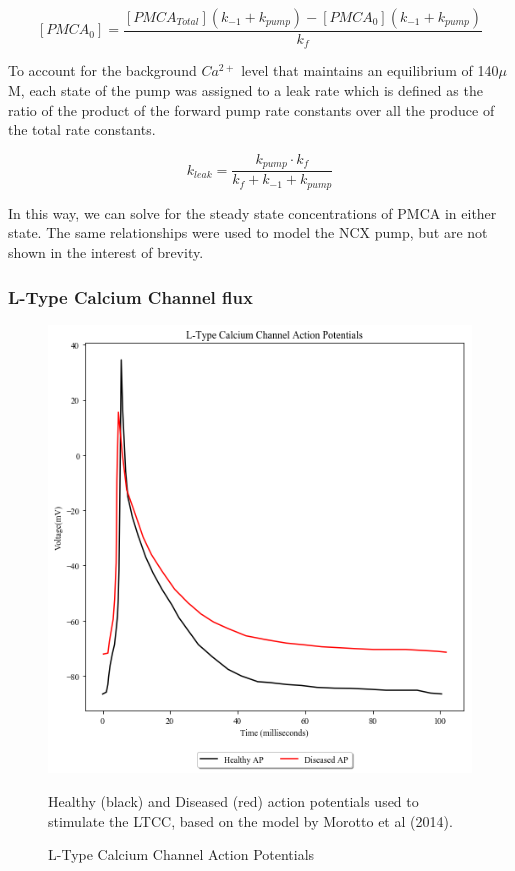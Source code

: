 \documentclass[12pt]{ucsddissertation}
\begin{document}
\begin{equation}
\left[PMCA_{0}\right] = \frac{\left[PMCA_{Total}\right] (k_{-1} + k_{pump}) - \left[PMCA_{0}\right](k_{-1} + k_{pump})}{k_{f}}
\end{equation}

To account for the background $Ca^{2+}$ level that maintains an equilibrium of 140$\mu$M, each state of the pump was assigned to a leak rate which is defined as the ratio of the product of the forward pump rate constants over all the produce of the total rate constants. 

\begin{equation}
k_{leak} = \frac{k_{pump} \cdot k_{f}}{k_{f}+ k_{-1}+ k_{pump}}
\end{equation}


In this way, we can solve for the steady state concentrations of PMCA in either state. The same relationships were used to model the NCX pump, but are not shown in the interest of brevity. 


\subsubsection{L-Type Calcium Channel flux}

\setcounter{figure}{3}
\begin{figure}
\centering
	\includegraphics[scale=0.5]{ap.png}
	\caption{L-Type Calcium Channel Action Potentials}Healthy (black) and Diseased (red) action potentials used to stimulate the LTCC, based on the model by Morotto et al (2014).
\end{figure}
\end{document}

